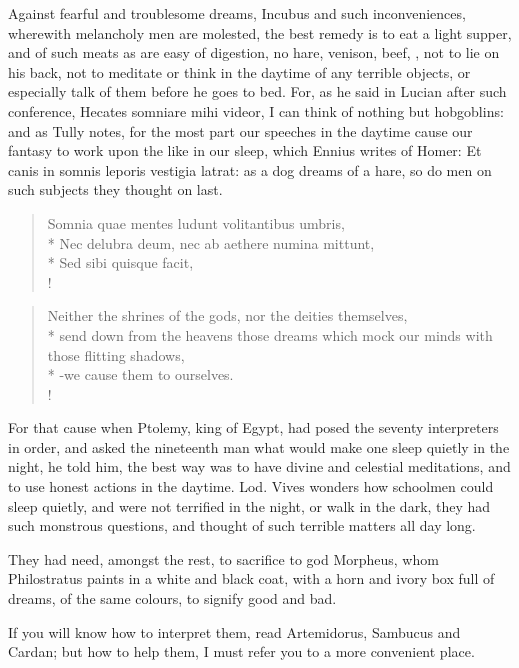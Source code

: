 {Against fearful and troublesome dreams, Incubus and such
inconveniences, wherewith melancholy men are molested, the best remedy
is to eat a light supper, and of such meats as are easy of digestion,
no hare, venison, beef, \etc{}, not to lie on his back, not to meditate or
think in the daytime of any terrible objects, or especially talk of
them before he goes to bed. For, as he said in Lucian after such
conference, Hecates somniare mihi videor, I can think of nothing but
hobgoblins: and as Tully notes,  for the most part our speeches
in the daytime cause our fantasy to work upon the like in our sleep,
which Ennius writes of Homer: Et canis in somnis leporis vestigia
latrat: as a dog dreams of a hare, so do men on such subjects they
thought on last.
%
%
\begin{latin}%
\begin{verse}%
Somnia quae mentes ludunt volitantibus umbris,\\*
Nec delubra deum, nec ab aethere numina mittunt,\\*
Sed sibi quisque facit, \etc{}\\!
\end{verse}%
\end{latin}%
\translationrule%
\begin{verse}%
Neither the shrines of the gods, nor the deities themselves,\\*
send down from the heavens those dreams which mock our minds with those flitting shadows,\\*
-we cause them to ourselves.\\!
\end{verse}%
%
For that cause when Ptolemy, king of Egypt, had posed the seventy
interpreters in order, and asked the nineteenth man what would make one
sleep quietly in the night, he told him, the best way was to have
divine and celestial meditations, and to use honest actions in the
daytime. Lod. Vives wonders how schoolmen could sleep quietly,
and were not terrified in the night, or walk in the dark, they had such
monstrous questions, and thought of such terrible matters all day long.

They had need, amongst the rest, to sacrifice to god Morpheus, whom
 Philostratus paints in a white and black coat, with a horn and
ivory box full of dreams, of the same colours, to signify good and bad.

If you will know how to interpret them, read Artemidorus, Sambucus and
Cardan; but how to help them, I must refer you to a more
convenient place.

}
